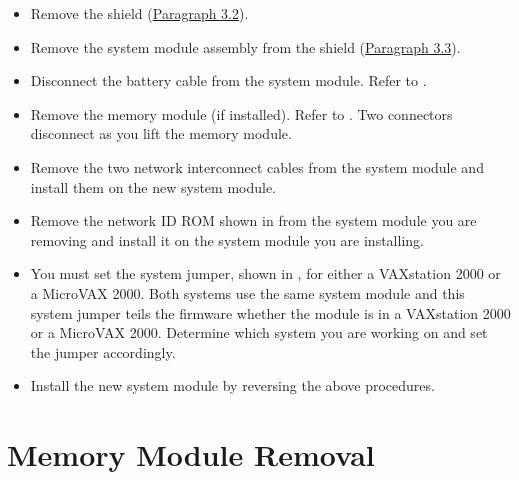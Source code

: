 \begin{itemize}

\item	Remove the shield (\hyperlink{section.3.2}{Paragraph 3.2}).

\item	Remove the system module assembly from the shield (\hyperlink{section.3.3}{Paragraph 3.3}).

\item	Disconnect the battery cable from the system module. Refer to .

\newpage

\item	Remove the memory module (if installed). Refer to . Two
		connectors disconnect as you lift the memory module.

\item	Remove the two network interconnect cables from the system module
		and install them on the new system module.

\newpage

\item	Remove the network ID ROM shown in  from the system
		module you are removing and install it on the system module you are
		installing.
\newpage

\item	You must set the system jumper, shown in , for either a
		VAXstation 2000 or a MicroVAX 2000. Both systems use the same 
		system module and this system jumper teils the firmware whether the 
		module is in a VAXstation 2000 or a MicroVAX 2000. Determine which 
		system you are working on and set the jumper accordingly.

\item	Install the new system module by reversing the above procedures.

\end{itemize}

\newpage

\section{Memory Module Removal}

